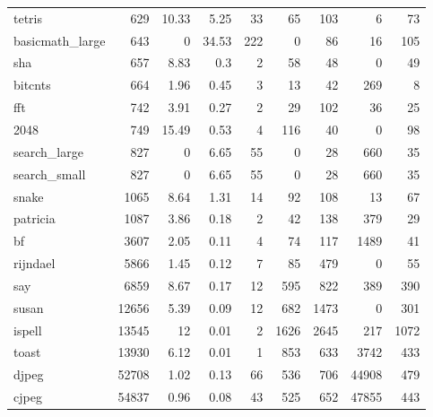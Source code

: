 \begin{tabular}{lrrrrrrrr}
 tetris          &            629 &    10.33 &   5.25 &   33 &     65 &          103 &     6 &    73 \\
 basicmath\_large &            643 &     0    &  34.53 &  222 &      0 &           86 &    16 &   105 \\
 sha             &            657 &     8.83 &   0.3  &    2 &     58 &           48 &     0 &    49 \\
 bitcnts         &            664 &     1.96 &   0.45 &    3 &     13 &           42 &   269 &     8 \\
 fft             &            742 &     3.91 &   0.27 &    2 &     29 &          102 &    36 &    25 \\
 2048            &            749 &    15.49 &   0.53 &    4 &    116 &           40 &     0 &    98 \\
 search\_large    &            827 &     0    &   6.65 &   55 &      0 &           28 &   660 &    35 \\
 search\_small    &            827 &     0    &   6.65 &   55 &      0 &           28 &   660 &    35 \\
 snake           &           1065 &     8.64 &   1.31 &   14 &     92 &          108 &    13 &    67 \\
 patricia        &           1087 &     3.86 &   0.18 &    2 &     42 &          138 &   379 &    29 \\
 bf              &           3607 &     2.05 &   0.11 &    4 &     74 &          117 &  1489 &    41 \\
 rijndael        &           5866 &     1.45 &   0.12 &    7 &     85 &          479 &     0 &    55 \\
 say             &           6859 &     8.67 &   0.17 &   12 &    595 &          822 &   389 &   390 \\
 susan           &          12656 &     5.39 &   0.09 &   12 &    682 &         1473 &     0 &   301 \\
 ispell          &          13545 &    12    &   0.01 &    2 &   1626 &         2645 &   217 &  1072 \\
 toast           &          13930 &     6.12 &   0.01 &    1 &    853 &          633 &  3742 &   433 \\
 djpeg           &          52708 &     1.02 &   0.13 &   66 &    536 &          706 & 44908 &   479 \\
 cjpeg           &          54837 &     0.96 &   0.08 &   43 &    525 &          652 & 47855 &   443 \\
\hline

\end{tabular}
